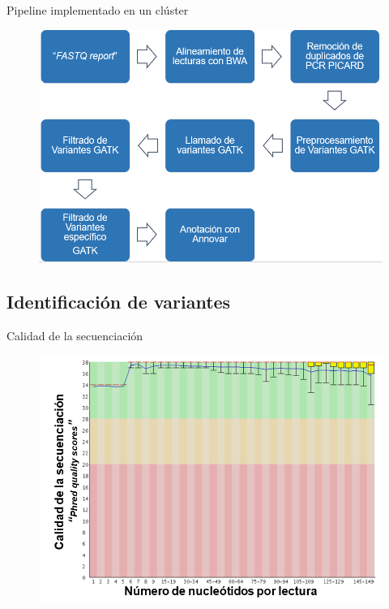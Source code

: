 \documentclass[xcolor=dvipsnames]{beamer}
\begin{document}
\begin{frame}{Pipeline implementado en un clúster}
	
	\begin{figure}
		\includegraphics[width=1\textwidth]{pipeline1}
		
	\end{figure}
	
\end{frame}
\subsection{Identificación de variantes}

\begin{frame}{Calidad de la secuenciación}
	\begin{figure}
			\centering
		\includegraphics[width=0.8\linewidth]{calidadfastq.png}
		\end{figure}
	\end{frame}
\end{document}

